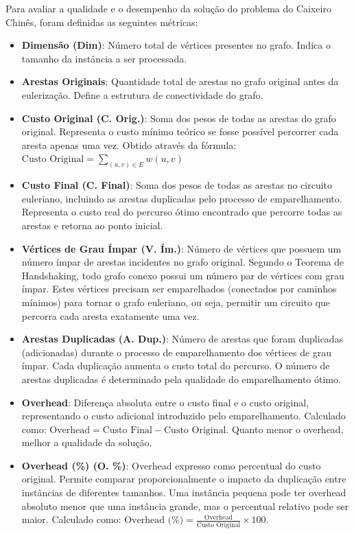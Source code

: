 \documentclass[12pt]{article}
\begin{document}
Para avaliar a qualidade e o desempenho da solução do problema do Caixeiro Chinês, foram definidas as seguintes métricas:

\begin{itemize}
    \item \textbf{Dimensão (Dim)}: Número total de vértices presentes no grafo. Indica o tamanho da instância a ser processada.
    
    \item \textbf{Arestas Originais}: Quantidade total de arestas no grafo original antes da eulerização. Define a estrutura de conectividade do grafo.
    
    \item \textbf{Custo Original (C. Orig.)}: Soma dos pesos de todas as arestas do grafo original. Representa o custo mínimo teórico se fosse possível percorrer cada aresta apenas uma vez. Obtido através da fórmula: $\text{Custo Original} = \sum_{(u,v) \in E} w(u,v)$
    
    \item \textbf{Custo Final (C. Final)}: Soma dos pesos de todas as arestas no circuito euleriano, incluindo as arestas duplicadas pelo processo de emparelhamento. Representa o custo real do percurso ótimo encontrado que percorre todas as arestas e retorna ao ponto inicial.
    
    \item \textbf{Vértices de Grau Ímpar (V. Ím.)}: Número de vértices que possuem um número ímpar de arestas incidentes no grafo original. Segundo o Teorema de Handshaking, todo grafo conexo possui um número par de vértices com grau ímpar. Estes vértices precisam ser emparelhados (conectados por caminhos mínimos) para tornar o grafo euleriano, ou seja, permitir um circuito que percorra cada aresta exatamente uma vez.
    
    \item \textbf{Arestas Duplicadas (A. Dup.)}: Número de arestas que foram duplicadas (adicionadas) durante o processo de emparelhamento dos vértices de grau ímpar. Cada duplicação aumenta o custo total do percurso. O número de arestas duplicadas é determinado pela qualidade do emparelhamento ótimo.
    
    \item \textbf{Overhead}: Diferença absoluta entre o custo final e o custo original, representando o custo adicional introduzido pelo emparelhamento. Calculado como: $\text{Overhead} = \text{Custo Final} - \text{Custo Original}$. Quanto menor o overhead, melhor a qualidade da solução.
    
    \item \textbf{Overhead (\%) (O. \%)}: Overhead expresso como percentual do custo original. Permite comparar proporcionalmente o impacto da duplicação entre instâncias de diferentes tamanhos. Uma instância pequena pode ter overhead absoluto menor que uma instância grande, mas o percentual relativo pode ser maior. Calculado como: $\text{Overhead (\%)} = \frac{\text{Overhead}}{\text{Custo Original}} \times 100$.
\end{itemize}
\end{document}
